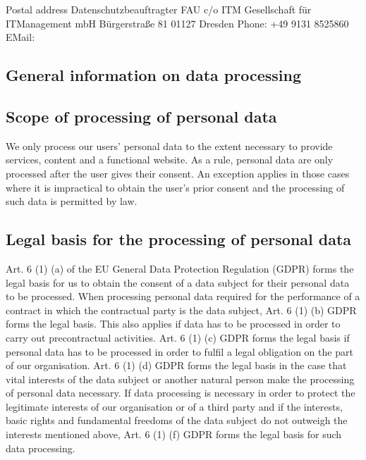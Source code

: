 \documentclass[letterpaper,10pt,english]{sphinxmanual}
\begin{document}
\sphinxAtStartPar
Postal address
Datenschutzbeauftragter FAU
c/o ITM Gesellschaft für IT\sphinxhyphen{}Management mbH
Bürgerstraße 81
01127 Dresden
Phone: +49 9131 85\sphinxhyphen{}25860
EMail: 


\subsection{General information on data processing}
\label{\detokenize{policies/privacy:general-information-on-data-processing}}

\subsection{Scope of processing of personal data}
\label{\detokenize{policies/privacy:scope-of-processing-of-personal-data}}
\sphinxAtStartPar
We only process our users’ personal data to the extent necessary to provide services, content and a functional website. As a rule, personal data are only processed after the user gives their consent. An exception applies in those cases where it is impractical to obtain the user’s prior consent and the processing of such data is permitted by law.


\subsection{Legal basis for the processing of personal data}
\label{\detokenize{policies/privacy:legal-basis-for-the-processing-of-personal-data}}
\sphinxAtStartPar
Art. 6 (1) (a) of the EU General Data Protection Regulation (GDPR) forms the legal basis for us to obtain the consent of a data subject for their personal data to be processed.
When processing personal data required for the performance of a contract in which the contractual party is the data subject, Art. 6 (1) (b) GDPR forms the legal basis. This also applies if data has to be processed in order to carry out pre\sphinxhyphen{}contractual activities.
Art. 6 (1) (c) GDPR forms the legal basis if personal data has to be processed in order to fulfil a legal obligation on the part of our organisation.
Art. 6 (1) (d) GDPR forms the legal basis in the case that vital interests of the data subject or another natural person make the processing of personal data necessary.
If data processing is necessary in order to protect the legitimate interests of our organisation or of a third party and if the interests, basic rights and fundamental freedoms of the data subject do not outweigh the interests mentioned above, Art. 6 (1) (f) GDPR forms the legal basis for such data processing.
\end{document}
